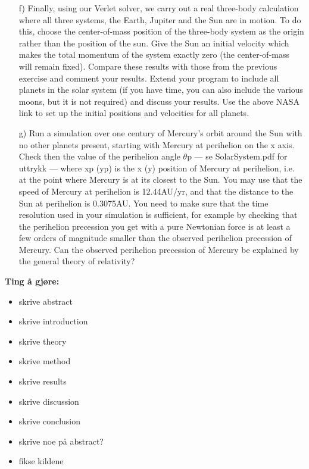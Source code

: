\documentclass{article}
\begin{document}
\begin{itemize}
    \item[f)] Finally, using our Verlet solver, we carry out a real three-body calculation where all three systems, the Earth, Jupiter and the Sun are in motion. To do this, choose the center-of-mass position of the three-body system as the origin rather than the position of the sun. Give the Sun an initial velocity which makes the total momentum of the system exactly zero (the center-of-mass will remain fixed). Compare these results with those from the previous exercise and comment your results. Extend your program to include all planets in the solar system (if you have time, you can also include the various moons, but it is not required) and discuss your results. Use the above NASA link to set up the initial positions and velocities for all planets. \\
    \item[g)] Run a simulation over one century of Mercury’s orbit around the Sun with no other planets present, starting with Mercury at perihelion on the x axis. Check then the value of the perihelion angle $\theta$p --- se SolarSystem.pdf for uttrykk --- where xp (yp) is the x (y) position of Mercury at perihelion, i.e. at the point where Mercury is at its closest to the Sun. You may use that the speed of Mercury at perihelion is 12.44AU/yr, and that the distance to the Sun at perihelion is 0.3075AU. You need to make sure that the time resolution used in your simulation is sufficient, for example by checking that the perihelion precession you get with a pure Newtonian force is at least a few orders of magnitude smaller than the observed perihelion precession of Mercury. Can the observed perihelion precession of Mercury be explained by the general theory of relativity? \\
\end{itemize}

\textbf{Ting å gjøre:}
\begin{itemize}
    \item skrive abstract \\
    \item skrive introduction \\
    \item skrive theory \\
    \item skrive method \\
    \item skrive results \\
    \item skrive discussion \\
    \item skrive conclusion \\
    \item skrive noe på abstract? \\
    \item fikse kildene \\
\end{itemize}
\end{document}
